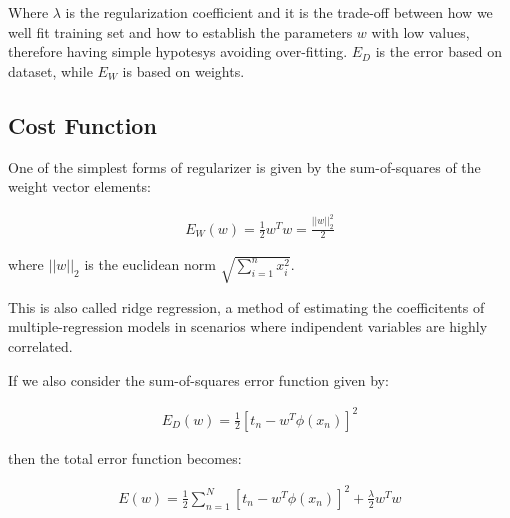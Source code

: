 \noindent Where $\lambda$ is the regularization coefficient and it is the trade-off between how we well fit training set and how to establish the parameters $w$ with low values, therefore having simple hypotesys avoiding over-fitting. $E_D$ is the error based on dataset, while $E_W$ is based on weights.

\subsection{Cost Function}
\label{subsec:regcostfun}

One of the simplest forms of regularizer is given by the sum-of-squares of the weight vector elements:
\begin{Equation}[H]
	\centering
		\begin{equation}
			\begin{aligned}
				E_W(w) = \frac{1}{2} w^T w = \frac{||w||^2_2}{2}
			\end{aligned}
		\end{equation}
	\label{eq:mathmodelaada}
\end{Equation}

\noindent where $||w||_2$ is the euclidean norm $\sqrt{ \sum_{i=1}^{n} x^2_i}$.

\noindent This is also called ridge regression, a method of estimating the coefficitents of multiple-regression models in scenarios where indipendent variables are highly correlated.

If we also consider the sum-of-squares error function given by:
\begin{Equation}[H]
	\centering
		\begin{equation}
			\begin{aligned}
				E_D(w) = \frac{1}{2} [t_n - w^T \phi(x_n)]^2
			\end{aligned}
		\end{equation}
	\label{eq:mathmodelaada}
\end{Equation}

then the total error function becomes:

\begin{Equation}[H]
	\centering
		\begin{equation}
			\begin{aligned}
				E(w) = \frac{1}{2} \sum_{n=1}^{N}[t_n - w^T \phi(x_n)]^2 + \frac{\lambda}{2} w^T w
			\end{aligned}
		\end{equation}
	\label{eq:mathmodelaada}
\end{Equation}

